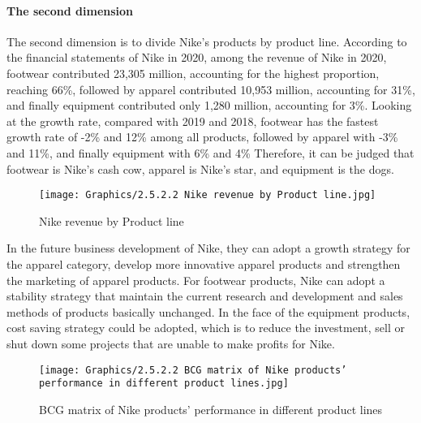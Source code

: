 \documentclass[a4paper, 12pt]{report}
\begin{document}
\paragraph{The second dimension}
The second dimension is to divide Nike's products by product line. According to the financial statements of Nike in 2020, among the revenue of Nike in 2020, footwear contributed 23,305 million, accounting for the highest proportion, reaching 66\%, followed by apparel contributed 10,953 million, accounting for 31\%, and finally equipment contributed only 1,280 million, accounting for 3\%. Looking at the growth rate, compared with 2019 and 2018, footwear has the fastest growth rate of -2\% and 12\% among all products, followed by apparel with -3\% and 11\%, and finally equipment with 6\% and 4\% Therefore, it can be judged that footwear is Nike's cash cow, apparel is Nike's star, and equipment is the dogs. \par
\begin{figure}[ht]
 			\begin{center}
				\texttt{[image: Graphics/2.5.2.2 Nike revenue by Product line.jpg]} 
			\end{center}
       		\caption{\label{2.5.2.2.1}Nike revenue by Product line}
 \end{figure}
In the future business development of Nike, they can adopt a growth strategy for the apparel category, develop more innovative apparel products and strengthen the marketing of apparel products. For footwear products, Nike can adopt a stability strategy that maintain the current research and development and sales methods of products basically unchanged. In the face of the equipment products, cost saving strategy could be adopted, which is to reduce the  investment, sell or shut down some projects that are unable to make profits for Nike.
\begin{figure}[ht]
 			\begin{center}
				\texttt{[image: Graphics/2.5.2.2 BCG matrix of Nike products' performance in different product lines.jpg]}
			\end{center}
       		\caption{\label{2.5.2.2.2}BCG matrix of Nike products' performance in different product lines}
 \end{figure}
\end{document}
